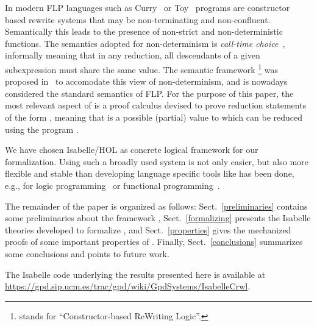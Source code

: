 \documentclass{llncs}
\begin{document}
In modern FLP languages such as Curry~\cite{Han06curry} or
Toy~\cite{LS99} programs are constructor based rewrite systems that
may be non-terminating and non-confluent. Semantically this leads to
the presence of non-strict and non-deterministic functions. The
semantics adopted for non-determinism is \emph{call-time
  choice}~\cite{hussmann93,GHLR99}, informally meaning that in any
reduction, all descendants of a given subexpression must share the
same value. The semantic framework \crwl \footnote{\crwl{} stands for ``Constructor-based ReWriting Logic''.}
was proposed in~\cite{GHLR96,GHLR99} to accomodate this view of
non-determinism, and is nowadays considered the standard semantics of
FLP. For the purpose of this paper, the most relevant aspect of
\crwl{} is a proof calculus devised to prove reduction statements of
the form , meaning that  is a possible
(partial) value to which  can be reduced using the program .




We have chosen Isabelle/HOL as concrete logical framework for our
formalization. Using such a broadly used system is not only easier,
but also more flexible and stable than developing language specific
tools like has been done, e.g., for logic programming~\cite{Stark98}
or functional programming~\cite{MolEP01}.

The remainder of the paper is organized as follows:
Sect.~\ref{preliminaries} contains some preliminaries about the
\crwl{} framework ,
Sect.~\ref{formalizing} presents the Isabelle theories developed to
formalize \crwl{}, and Sect.~\ref{properties} gives the mechanized
proofs of some important properties of \crwl{}. Finally,
Sect.~\ref{conclusions} summarizes some conclusions and points to
future work.

The Isabelle code underlying the results presented here is available
at \url{https://gpd.sip.ucm.es/trac/gpd/wiki/GpdSystems/IsabelleCrwl}.
\end{document}
